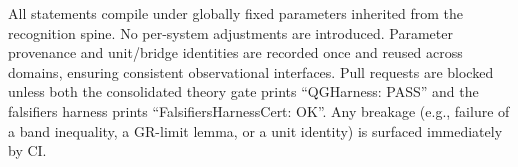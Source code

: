 \documentclass[aps,prd,twocolumn,superscriptaddress,nofootinbib,floatfix,longbibliography]{revtex4-2}
\newcommand{\lean}[1]{\texttt{\detokenize{#1}}}
\begin{document}
%
All statements compile under globally fixed parameters inherited from the recognition spine. No per-system adjustments are introduced. Parameter provenance and unit/bridge identities are recorded once and reused across domains, ensuring consistent observational interfaces.
%
Pull requests are blocked unless both the consolidated theory gate prints ``QGHarness: PASS'' and the falsifiers harness prints ``FalsifiersHarnessCert: OK''. Any breakage (e.g., failure of a band inequality, a GR-limit lemma, or a unit identity) is surfaced immediately by CI.
%
\end{document}
